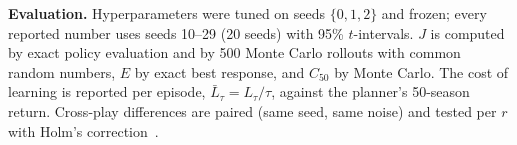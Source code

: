 \textbf{Evaluation.} Hyperparameters were tuned on seeds $\{0,1,2\}$ and frozen; every reported number uses seeds 10--29
(20 seeds) with 95\% $t$-intervals. $J$ is computed by exact policy evaluation and by 500 Monte Carlo rollouts with
common random numbers, $E$ by exact best response, and $C_{50}$ by Monte Carlo. The cost of learning is reported per
episode, $\bar L_\tau=L_\tau/\tau$, against the planner's 50-season return. Cross-play differences are paired (same seed,
same noise) and tested per $r$ with Holm's correction~\cite{holm1979}.

